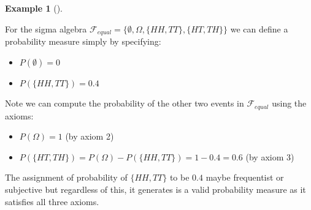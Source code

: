 \documentclass[
  letterpaper,
  DIV=11,
  numbers=noendperiod]{scrreport}
\providecommand{\tightlist}{%
  \setlength{\itemsep}{0pt}\setlength{\parskip}{0pt}}
\theoremstyle{definition}
\newtheorem{example}{Example}[chapter]
\theoremstyle{plain}
\theoremstyle{definition}
\theoremstyle{plain}
\theoremstyle{remark}
\begin{document}
\begin{tcolorbox}[enhanced jigsaw, breakable, opacityback=0, leftrule=.75mm, colback=white, bottomtitle=1mm, coltitle=black, toptitle=1mm, titlerule=0mm, bottomrule=.15mm, colframe=quarto-callout-note-color-frame, title={Probability measure for the equality of two coin flips}, opacitybacktitle=0.6, colbacktitle=quarto-callout-note-color!10!white, rightrule=.15mm, arc=.35mm, toprule=.15mm, left=2mm]

\begin{example}[]\protect\hypertarget{exm-probability-measure-equal}{}\label{exm-probability-measure-equal}

For the sigma algebra
\(\mathcal F_{equal}=\{\emptyset, \Omega, \{HH,TT\}, \{HT,TH\}\}\) we
can define a probability measure simply by specifying:

\begin{itemize}
\tightlist
\item
  \(P(\emptyset) = 0\)
\item
  \(P(\{HH,TT\}) = 0.4\)
\end{itemize}

Note we can compute the probability of the other two events in
\(\mathcal F_{equal}\) using the axioms:

\begin{itemize}
\item
  \(P(\Omega) = 1\) (by axiom 2)
\item
  \(P(\{HT,TH\}) = P(\Omega) - P(\{HH,TT\}) = 1 - 0.4 = 0.6\) (by axiom
  3)
\end{itemize}

The assignment of probability of \(\{HH,TT\}\) to be \(0.4\) maybe
frequentist or subjective but regardless of this, it generates is a
valid probability measure as it satisfies all three axioms.

\end{example}

\end{tcolorbox}
\end{document}
